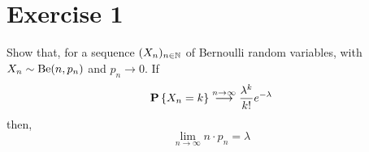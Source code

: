 \section{Exercise 1}
Show that, for a sequence $(X_n)_{n\in\N}$ of Bernoulli random variables, with $X_n \sim \Be(n,p_n)$ and $p_n \to 0$. If
\[ \P\left\{ X_n = k \right\} \overset{n\to\infty}{\longrightarrow} \frac{\lambda^k}{k!} e^{-\lambda} \]
then,
\[ \lim_{n\to\infty} n \cdot p_n = \lambda \]

